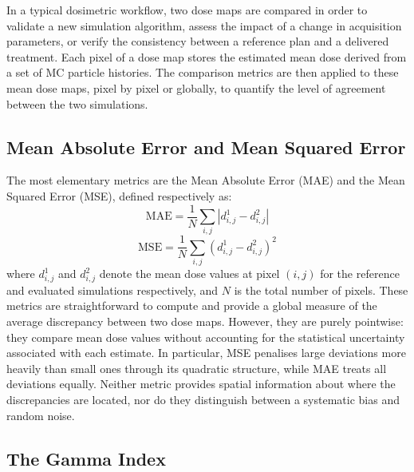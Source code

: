\documentclass[12pt]{article}
\begin{document}
In a typical dosimetric workflow, two dose maps are compared in order to validate a new
simulation algorithm, assess the impact of a change in acquisition parameters, or verify the
consistency between a reference plan and a delivered treatment. Each pixel of a dose map
stores the estimated mean dose derived from a set of MC particle histories. The comparison
metrics are then applied to these mean dose maps, pixel by pixel or globally, to quantify the
level of agreement between the two simulations.

\subsection{Mean Absolute Error and Mean Squared Error}

The most elementary metrics are the Mean Absolute Error (MAE) and the Mean Squared
Error (MSE), defined respectively as:
\begin{equation}
    \mathrm{MAE} = \frac{1}{N} \sum_{i,j} \left| d^1_{i,j} - d^2_{i,j} \right|
\end{equation}
\begin{equation}
    \mathrm{MSE} = \frac{1}{N} \sum_{i,j} \left( d^1_{i,j} - d^2_{i,j} \right)^2
\end{equation}
where $d^1_{i,j}$ and $d^2_{i,j}$ denote the mean dose values at pixel $(i,j)$ for the reference
and evaluated simulations respectively, and $N$ is the total number of pixels. These metrics
are straightforward to compute and provide a global measure of the average discrepancy between
two dose maps. However, they are purely pointwise: they compare mean dose values without
accounting for the statistical uncertainty associated with each estimate. In particular, MSE
penalises large deviations more heavily than small ones through its quadratic structure, while
MAE treats all deviations equally. Neither metric provides spatial information about where the
discrepancies are located, nor do they distinguish between a systematic bias and random noise.

\subsection{The Gamma Index}
\end{document}
